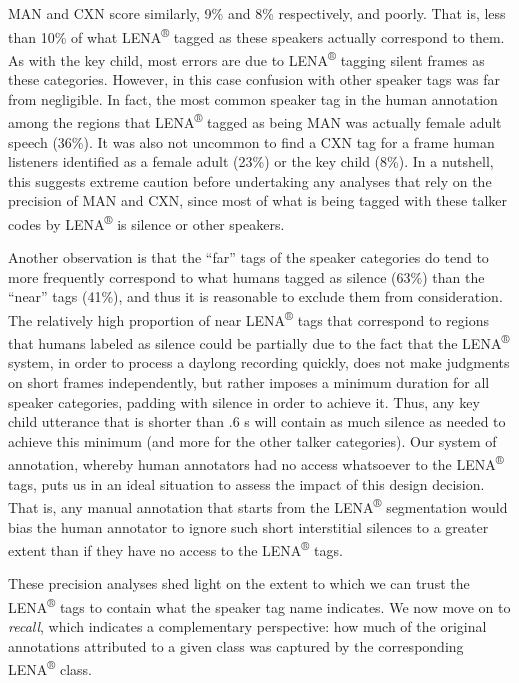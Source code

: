\documentclass[english,floatsintext,man]{apa6}
\begin{document}
MAN and CXN score similarly, 9\% and 8\% respectively, and poorly. That
is, less than 10\% of what LENA\textsuperscript{®} tagged as these
speakers actually correspond to them. As with the key child, most errors
are due to LENA\textsuperscript{®} tagging silent frames as these
categories. However, in this case confusion with other speaker tags was
far from negligible. In fact, the most common speaker tag in the human
annotation among the regions that LENA\textsuperscript{®} tagged as
being MAN was actually female adult speech (36\%). It was also not
uncommon to find a CXN tag for a frame human listeners identified as a
female adult (23\%) or the key child (8\%). In a nutshell, this suggests
extreme caution before undertaking any analyses that rely on the
precision of MAN and CXN, since most of what is being tagged with these
talker codes by LENA\textsuperscript{®} is silence or other speakers.

Another observation is that the \enquote{far} tags of the speaker
categories do tend to more frequently correspond to what humans tagged
as silence (63\%) than the \enquote{near} tags (41\%), and thus it is
reasonable to exclude them from consideration. The relatively high
proportion of near LENA\textsuperscript{®} tags that correspond to
regions that humans labeled as silence could be partially due to the
fact that the LENA\textsuperscript{®} system, in order to process a
daylong recording quickly, does not make judgments on short frames
independently, but rather imposes a minimum duration for all speaker
categories, padding with silence in order to achieve it. Thus, any key
child utterance that is shorter than .6 s will contain as much silence
as needed to achieve this minimum (and more for the other talker
categories). Our system of annotation, whereby human annotators had no
access whatsoever to the LENA\textsuperscript{®} tags, puts us in an
ideal situation to assess the impact of this design decision. That is,
any manual annotation that starts from the LENA\textsuperscript{®}
segmentation would bias the human annotator to ignore such short
interstitial silences to a greater extent than if they have no access to
the LENA\textsuperscript{®} tags.

These precision analyses shed light on the extent to which we can trust
the LENA\textsuperscript{®} tags to contain what the speaker tag name
indicates. We now move on to \emph{recall}, which indicates a
complementary perspective: how much of the original annotations
attributed to a given class was captured by the corresponding
LENA\textsuperscript{®} class.
\end{document}

